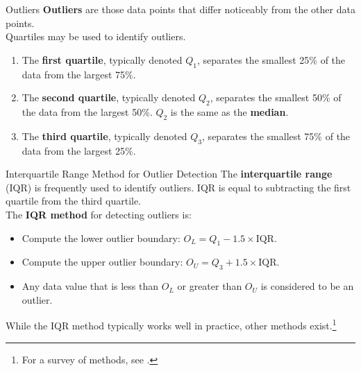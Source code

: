 \documentclass[pdf]{beamer}
\newcommand{\empr}[1]{{\color{franklinblue}\textbf{#1}}}
\theoremstyle{remark}
\theoremstyle{definition}
\begin{document}
\begin{frame}[t]{Outliers}
\empr{Outliers} are those data points that differ noticeably from the other data points. \\
\vspace{1.5ex}
Quartiles may be used to identify outliers. \\
\vspace{1.5ex}
\begin{enumerate}
\item The \empr{first quartile}, typically denoted $Q_1$, separates the smallest 25\% of the data from the largest 75\%. 
\item The \empr{second quartile}, typically denoted $Q_2$, separates the smallest 50\% of the data from the largest 50\%. $Q_2$ is the same as the \empr{median}. 
\item The \empr{third quartile}, typically denoted $Q_3$, separates the smallest 75\% of the data from the largest 25\%.
\end{enumerate}
\end{frame}

\begin{frame}[t]{Interquartile Range Method for Outlier Detection}
The \empr{interquartile range} (IQR) is frequently used to identify outliers.  IQR is equal to subtracting the first quartile from the third quartile.  \\
\vspace{1.5ex}
The \empr{IQR method} for detecting outliers is: \\
\vspace{1.5ex}
\begin{itemize}
  \item Compute the lower outlier boundary:  $O_L = Q_1 - 1.5 \times \text{IQR}$.
  \item Compute the upper outlier boundary:  $O_U = Q_3 + 1.5 \times \text{IQR}$.
  \item Any data value that is less than $O_L$ or greater than $O_U$ is considered to be an outlier.
\end{itemize}
\normalsize
While the IQR method typically works well in practice, other methods exist.\footnote{For a survey of methods, see \cite{aguinis2013}.}
\end{frame}
\end{document}
